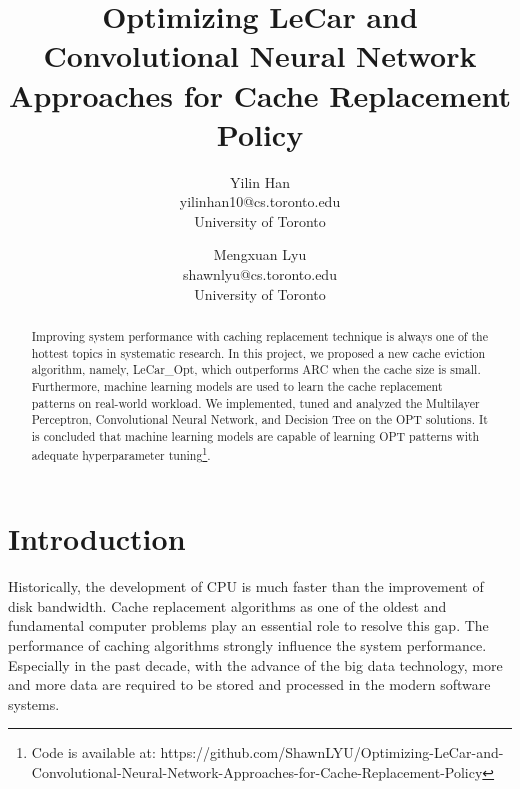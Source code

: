 \documentclass[letterpaper,twocolumn,10pt]{article}
\begin{document}

\date{}

\title{\Large \bf Optimizing LeCar and Convolutional Neural Network Approaches for Cache Replacement Policy}

\author{
{\rm Yilin Han}\\
yilinhan10@cs.toronto.edu\\
University of Toronto
\and
{\rm Mengxuan Lyu}\\
shawnlyu@cs.toronto.edu\\
University of Toronto
} %

\maketitle

\begin{abstract}
Improving system performance with caching replacement technique is always one of the hottest topics in systematic research. In this project, we proposed a new cache eviction algorithm, namely, LeCar\_Opt, which outperforms ARC when the cache size is small. Furthermore, machine learning models are used to learn the cache replacement patterns on real-world workload. We implemented, tuned and analyzed the Multilayer Perceptron, Convolutional Neural Network, and Decision Tree on the OPT solutions. It is concluded that machine learning models are capable of learning OPT patterns with adequate hyperparameter tuning\footnote{Code is available at: https://github.com/ShawnLYU/Optimizing-LeCar-and-Convolutional-Neural-Network-Approaches-for-Cache-Replacement-Policy}.


\end{abstract}


\section{Introduction}

Historically, the development of CPU is much faster than the improvement of disk bandwidth. Cache replacement algorithms as one of the oldest and fundamental computer problems play an essential role to resolve this gap. The performance of caching algorithms strongly influence the system performance. Especially in the past decade,  with the advance of the big data technology, more and more data are required to be stored and processed in the modern software systems. 
\end{document}
